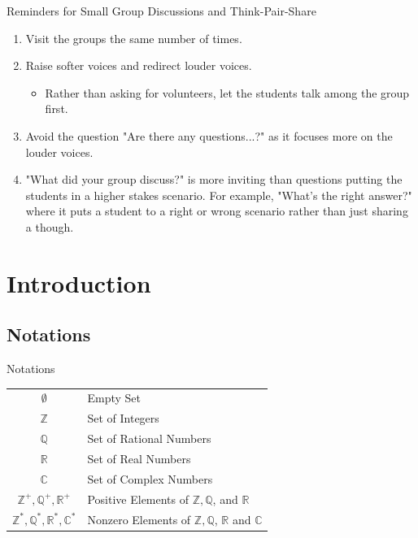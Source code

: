 \documentclass{beamer}
\begin{document}
\begin{frame}{Reminders for Small Group Discussions and Think-Pair-Share}
\begin{enumerate}
    \justifying
    \item Visit the groups the same number of times.
    \item Raise softer voices and redirect louder voices.
    \begin{itemize}
    	\justifying
        \item Rather than asking for volunteers, let the students talk among the group first. 
    \end{itemize}
    \item Avoid the question "Are there any questions...?" as it focuses more on the louder voices.
    \item "What did your group discuss?" is more inviting than questions putting the students in a higher stakes scenario. For example, "What's the right answer?" where it puts a student to a right or wrong scenario rather than just sharing a though.  
\end{enumerate}
\end{frame}

\section*{Introduction}


\subsection{Notations}

\begin{frame}{Notations}
\begin{table}[h]
\centering
\begin{tabular}{c| l}
$\emptyset$ & Empty Set  \\
$\mathbb{Z}$ & Set of Integers \\ 
$\mathbb{Q}$ & Set of Rational Numbers \\ 
$\mathbb{R}$ & Set of Real Numbers \\ 
$\mathbb{C}$ & Set of Complex Numbers \\ 
$\mathbb{Z}^+, \mathbb{Q}^+, \mathbb{R}^+$ & Positive Elements of $\mathbb{Z}, \mathbb{Q}$, and $\mathbb{R}$ \\ 
$\mathbb{Z}^*, \mathbb{Q}^*, \mathbb{R}^*, \mathbb{C}^*$ & Nonzero Elements of $\mathbb{Z}, \mathbb{Q}$, $\mathbb{R}$ and $\mathbb{C}$ \\ 
\end{tabular}
\end{table}
\end{frame}
\end{document}
